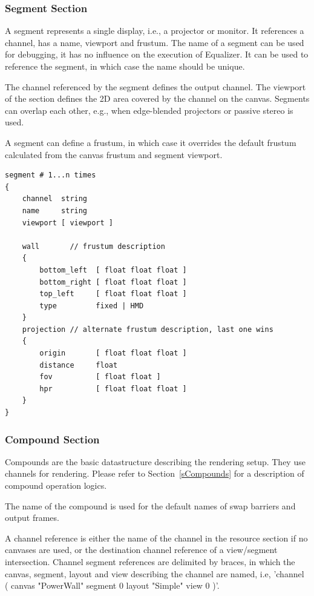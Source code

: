 \documentclass[10pt,a4]{scrartcl}
\newcommand{\sref}[1]{Section~\ref{#1}}
\begin{document}
\subsubsection{Segment Section}

A segment represents a single display, i.e., a projector or monitor. It
references a channel, has a name, viewport and frustum. The name of a
segment can be used for debugging, it has no influence on the execution
of Equalizer. It can be used to reference the segment, in which case the
name should be unique.

The channel referenced by the segment defines the output channel. The
viewport of the section defines the 2D area covered by the channel on
the canvas. Segments can overlap each other, e.g., when edge-blended
projectors or passive stereo is used.

A segment can define a frustum, in which case it overrides the default
frustum calculated from the canvas frustum and segment viewport.

{\footnotesize\begin{lstlisting}
segment # 1...n times
{
    channel  string
    name     string
    viewport [ viewport ] 

    wall       // frustum description
    {
        bottom_left  [ float float float ]
        bottom_right [ float float float ]
        top_left     [ float float float ]
        type         fixed | HMD
    }
    projection // alternate frustum description, last one wins
    {
        origin       [ float float float ]
        distance     float
        fov          [ float float ]
        hpr          [ float float float ]
    }
}
\end{lstlisting}}

\subsubsection{Compound Section}

Compounds are the basic datastructure describing the rendering
setup. They use channels for rendering. Please refer to
\sref{sCompounds} for a description of compound operation logics.

The name of the compound is used for the default names of swap barriers
and output frames.

A channel reference is either the name of the channel in the resource
section if no canvases are used, or the destination channel reference of
a view/segment intersection. Channel segment references are delimited by
braces, in which the canvas, segment, layout and view describing the
channel are named, i.e, 'channel ( canvas "PowerWall" segment 0 layout
"Simple" view 0 )'.
\end{document}
